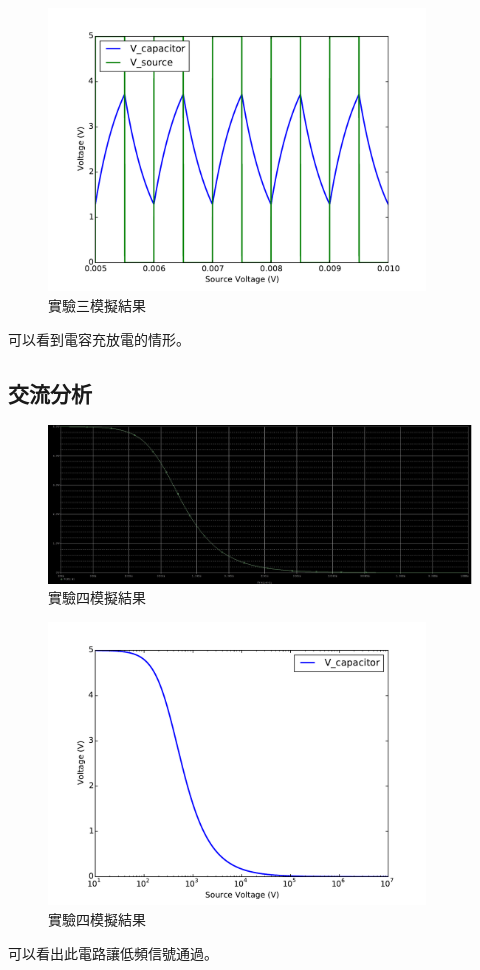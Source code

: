 \documentclass[12pt, a4paper]{article}
\begin{document}
\begin{figure}[H]
	\begin{center}
		\includegraphics[width=10cm]{data/q3i.pdf}
		\caption{實驗三模擬結果}
		\label{fig:fig3}
	\end{center}
\end{figure}
可以看到電容充放電的情形。

\subsection{交流分析}

\begin{figure}[H]
	\begin{center}
		\includegraphics[width=15cm]{data/q4.jpg}
		\caption{實驗四模擬結果}
		\label{fig:fig4}
	\end{center}
\end{figure}

\begin{figure}[H]
	\begin{center}
		\includegraphics[width=10cm]{data/q4i.pdf}
		\caption{實驗四模擬結果}
		\label{fig:fig4}
	\end{center}
\end{figure}
可以看出此電路讓低頻信號通過。
\end{document}
